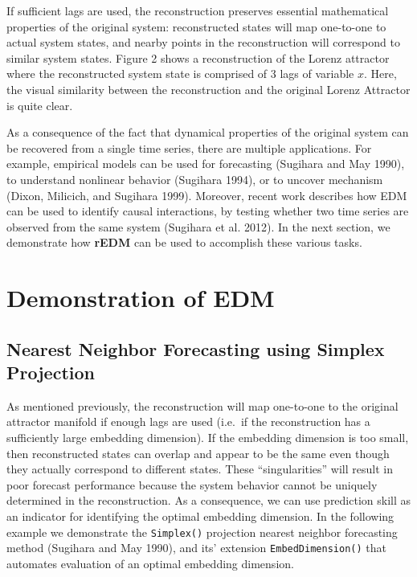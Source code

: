 \documentclass[]{article}
\begin{document}
If sufficient lags are used, the reconstruction preserves essential
mathematical properties of the original system: reconstructed states
will map one-to-one to actual system states, and nearby points in the
reconstruction will correspond to similar system states. Figure 2 shows
a reconstruction of the Lorenz attractor where the reconstructed system
state is comprised of 3 lags of variable \(x\). Here, the visual
similarity between the reconstruction and the original Lorenz Attractor
is quite clear.

As a consequence of the fact that dynamical properties of the original
system can be recovered from a single time series, there are multiple
applications. For example, empirical models can be used for forecasting
(Sugihara and May 1990), to understand nonlinear behavior (Sugihara
1994), or to uncover mechanism (Dixon, Milicich, and Sugihara 1999).
Moreover, recent work describes how EDM can be used to identify causal
interactions, by testing whether two time series are observed from the
same system (Sugihara et al. 2012). In the next section, we demonstrate
how \textbf{rEDM} can be used to accomplish these various tasks.

\hypertarget{demonstration-of-edm}{%
\section{Demonstration of EDM}\label{demonstration-of-edm}}

\hypertarget{nearest-neighbor-forecasting-using-simplex-projection}{%
\subsection{Nearest Neighbor Forecasting using Simplex
Projection}\label{nearest-neighbor-forecasting-using-simplex-projection}}

As mentioned previously, the reconstruction will map one-to-one to the
original attractor manifold if enough lags are used (i.e.~if the
reconstruction has a sufficiently large embedding dimension). If the
embedding dimension is too small, then reconstructed states can overlap
and appear to be the same even though they actually correspond to
different states. These ``singularities'' will result in poor forecast
performance because the system behavior cannot be uniquely determined in
the reconstruction. As a consequence, we can use prediction skill as an
indicator for identifying the optimal embedding dimension. In the
following example we demonstrate the \texttt{Simplex()} projection
nearest neighbor forecasting method (Sugihara and May 1990), and its'
extension \texttt{EmbedDimension()} that automates evaluation of an
optimal embedding dimension.
\end{document}
